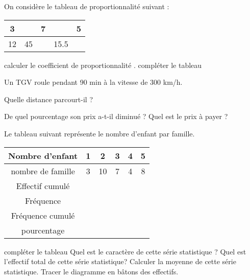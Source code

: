 \documentclass[a4paper,addpoints,12pt]{exam}
\begin{document}
\devoir[sem=2,prv=false,ds=false,num=6 ,niv=2 ,date=22/05/2023,Rdate=25/05/2023]


\begin{exo}
On considère le tableau de proportionnalité suivant :
\begin{tabular}{|c|c|c|c|c|}
\hline 
3 &  & 7 &  & 5 \\ 
\hline 
12 & 45 &  & 15.5 &  \\ 
\hline 
\end{tabular} 
\begin{questions}
\question calculer le coefficient de proportionnalité .
\question compléter le tableau 
\end{questions}
\end{exo}


\begin{exo}
Un TGV roule pendant 90 min  à la vitesse de 300 km/h.

Quelle distance parcourt-il ?
\end{exo}

\begin{exo}
\begin{questions}
\question  De quel pourcentage son prix a-t-il diminué ?
\question Quel est le prix à payer ?
\end{questions}
\end{exo}

\begin{exo}
Le tableau suivant représente le nombre d'enfant par famille.

\begin{tabular}{|c|c|c|c|c|c|}
\hline 
Nombre d'enfant & 1 & 2 & 3 & 4 & 5 \\ 
\hline 
nombre de famille & 3 & 10 & 7 & 4 & 8 \\ 
\hline 
Effectif cumulé  &  &  &  &  &  \\ 
\hline
Fréquence  &  &  &  &  &  \\ 
\hline 
Fréquence cumulé  &  &  &  &  &  \\ 
\hline
pourcentage &  &  &  &  &  \\ 
\hline 
\end{tabular} 
\begin{questions}
\question compléter le tableau
\question Quel est le caractère de cette série statistique ?
\question Quel est l'effectif total de cette série statistique?
\question Calculer la moyenne de cette série statistique.
\question Tracer le diagramme en bâtons des effectifs.
\end{questions}
\end{exo}
\end{document}
